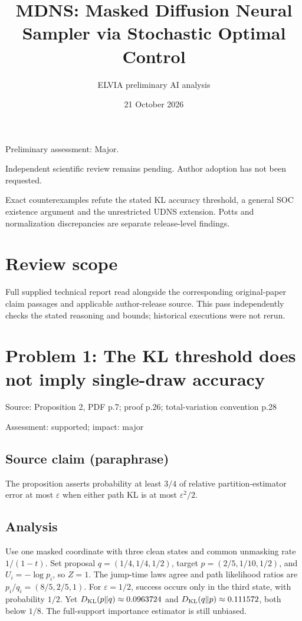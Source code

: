 \documentclass[11pt]{article}
\begin{document}
\title{MDNS: Masked Diffusion Neural Sampler via Stochastic Optimal Control}

\author{ELVIA preliminary AI analysis}\date{21 October 2026}\maketitle

Preliminary assessment: Major.\par

Independent scientific review remains pending. Author adoption has not been requested.

Exact counterexamples refute the stated KL accuracy threshold, a general SOC existence argument and the unrestricted UDNS extension. Potts and normalization discrepancies are separate release-level findings.

\section*{Review scope}

Full supplied technical report read alongside the corresponding original-paper claim passages and applicable author-release source. This pass independently checks the stated reasoning and bounds; historical executions were not rerun.

\section*{Problem 1: The KL threshold does not imply single-draw accuracy}

Source: Proposition 2, PDF p.7; proof p.26; total-variation convention p.28

Assessment: supported; impact: major

\subsection*{Source claim (paraphrase)}

The proposition asserts probability at least \(3/4\) of relative partition-estimator error at most \(\varepsilon\) when either path KL is at most \(\varepsilon^2/2\).

\subsection*{Analysis}

Use one masked coordinate with three clean states and common unmasking rate \(1/(1-t)\). Set proposal \(q=(1/4,1/4,1/2)\), target \(p=(2/5,1/10,1/2)\), and \(U_i=-\log p_i\), so \(Z=1\). The jump-time laws agree and path likelihood ratios are \(p_i/q_i=(8/5,2/5,1)\). For \(\varepsilon=1/2\), success occurs only in the third state, with probability \(1/2\). Yet \(D_{\rm KL}(p\Vert q)\approx0.0963724\) and \(D_{\rm KL}(q\Vert p)\approx0.111572\), both below \(1/8\). The full-support importance estimator is still unbiased.
\end{document}
